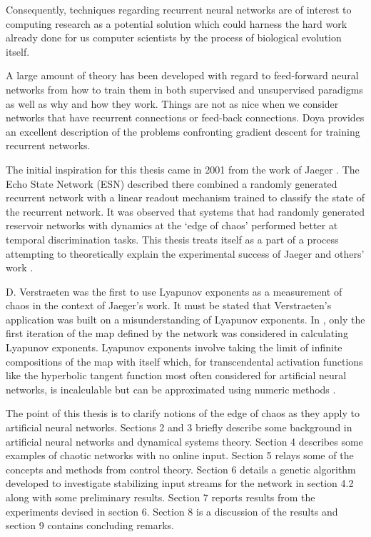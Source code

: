 \documentclass[12pt]{article}
\begin{document}
Consequently, techniques regarding recurrent neural networks
are of interest to computing research as a potential solution which could
harness the hard work already done for us computer scientists by the process
of biological evolution itself.

A large amount of theory has been developed with regard to feed-forward
neural networks from how to train them in both supervised and unsupervised
paradigms as well as why and how they work.  Things are not as nice when
we consider networks that have recurrent connections or feed-back connections.
Doya \cite{doya} 
provides an excellent description of the problems confronting gradient
descent for training recurrent networks.

The initial inspiration for this thesis came in 2001 from the work of
Jaeger \cite{jaeger_original}.
The Echo State Network (ESN) described there combined
a randomly generated recurrent network with a linear readout mechanism trained
to classify the state of the recurrent network.  It was observed that systems
that had randomly generated reservoir networks with dynamics at the `edge of
chaos' performed better at temporal discrimination tasks.  This
thesis treats itself as a part of a process attempting to theoretically
explain the experimental success of Jaeger and others' work
\cite{maass_original}.

D. Verstraeten \cite{verstraeten} was the first
to use Lyapunov exponents as a measurement of chaos in the context of Jaeger's
work.  It must be stated that Verstraeten's application was built on a
misunderstanding of Lyapunov exponents.  In \cite{verstraeten},
only the first iteration
of the map defined by the network was considered in calculating Lyapunov
exponents.  Lyapunov exponents involve taking the limit of infinite
compositions of the map with itself which, for transcendental activation
functions like the hyperbolic tangent function most often considered for
artificial neural networks, is incalculable but can be approximated using
numeric methods \cite{sprott}.

The point of this thesis is to clarify notions of the edge of chaos
as they apply to artificial neural networks.  Sections 2 and 3 briefly describe
some background in artificial neural networks and dynamical systems theory.
Section 4 describes some examples of chaotic networks with no online input.
Section 5 relays some of the concepts and methods from control theory.
Section 6 details a genetic algorithm developed to investigate stabilizing
input streams for the network in section 4.2 along with some preliminary
results.  Section 7 reports results from the experiments devised in section 6.
Section 8 is a discussion of the results and section 9 contains concluding remarks.
\end{document}
